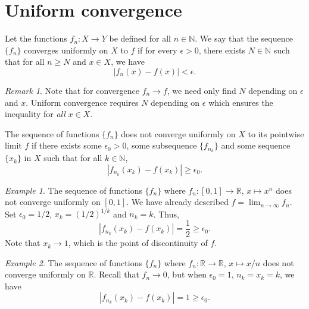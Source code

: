 \documentclass[11pt]{article}
\def\R{\mathbb{R}}
\def\N{\mathbb{N}}
\theoremstyle{definition}
\theoremstyle{remark}
\newtheorem*{remark}{Remark}
\newtheorem*{example}{Example}
\numberwithin{equation}{module}
\begin{document}
    
    \section{Uniform convergence}
    
    \begin{definition}
        Let the functions $f_n\colon X \to Y$ be defined for all $n \in \N$.
        We say that the sequence $\{f_n\}$ converges uniformly on $X$ to $f$ if
        for every $\epsilon > 0$, there exists $N \in \N$ such that for all $n \geq
        N$ and $x \in X$, we have \[
            |f_n(x) - f(x)| < \epsilon.
        \] 
        \begin{remark}
            Note that for convergence $f_n \to f$, we need only find $N$
            depending on $\epsilon$ and $x$. Uniform convergence requires $N$
            depending on $\epsilon$ which ensures the inequality for \emph{all} 
            $x \in X$.
        \end{remark}
    \end{definition}

    \begin{lemma}
        The sequence of functions $\{f_n\}$ does not converge uniformly on $X$ to
        its pointwise limit $f$ if there exists some $\epsilon_0 > 0$, some
        subsequence $\{f_{n_k}\}$ and some sequence $\{x_k\}$ in $X$ such that for
        all $k \in \N$, \[
            |f_{n_k}(x_k) - f(x_k)| \geq \epsilon_0.
        \] 
    \end{lemma}
    \begin{example}
        The sequence of functions $\{f_n\}$ where $f_n\colon [0, 1] \to \R$, $x
        \mapsto x^n$ does not converge uniformly on $[0, 1]$.
        We have already described $f = \lim_{n \to \infty} f_n$.
        Set $\epsilon_0 = 1 /2$, $x_k = (1 /2)^{1 /k}$ and $n_k = k$. Thus, \[
            |f_{n_k}(x_k) - f(x_k)| = \frac{1}{2} \geq \epsilon_0.
        \]
        Note that $x_k \to 1$, which is the point of discontinuity of $f$.
    \end{example}
    \begin{example}
        The sequence of functions $\{f_n\}$ where $f_n\colon \R \to \R$, $x \mapsto
        x /n$ does not converge uniformly on $\R$.
        Recall that $f_n \to 0$, but when $\epsilon_0 = 1$, $n_k = x_k = k$, we have
        \[
            |f_{n_k}(x_k) - f(x_k)| = 1 \geq \epsilon_0.
        \] 
    \end{example}
\end{document}
